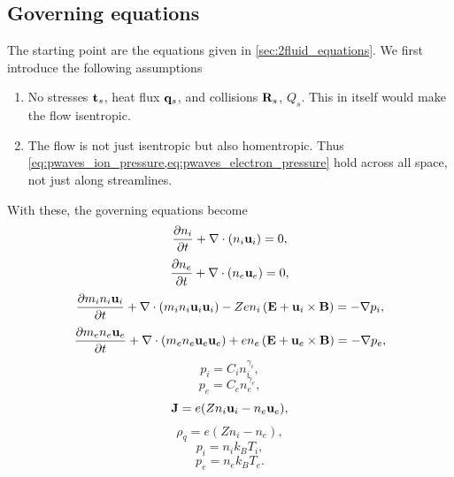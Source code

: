 \documentclass[a4paper,11pt]{report}
\begin{document}
\subsection{Governing equations}
The starting point are the equations given in \cref{sec:2fluid_equations}. We first introduce the following assumptions
\begin{enumerate}
    \item No stresses $\mathbf{t}_s$, heat flux $\mathbf{q}_s$, and collisions $\mathbf{R}_s$, $Q_s$. This in itself would make the flow isentropic.
    \item The flow is not just isentropic but also homentropic. Thus \cref{eq:pwaves_ion_pressure,eq:pwaves_electron_pressure} hold across all space, not just along streamlines.
\end{enumerate}
With these, the governing equations become
\begin{equation}
    \label{eq:pwaves_ion_density}
    \frac{\partial n_i}{\partial t} + \nabla \cdot \left (n_i \mathbf{u}_i \right ) = 0,
\end{equation}
\begin{equation}
    \label{eq:pwaves_electron_density}
    \frac{\partial n_e}{\partial t} + \nabla \cdot \left (n_e \mathbf{u}_e \right ) = 0,
\end{equation}
\begin{equation}
    \label{eq:pwaves_ion_momentum}
    \frac{\partial m_i n_i \mathbf{u}_i}{\partial t} + \nabla \cdot \left ( m_i n_i \mathbf{u}_i \mathbf{u}_i \right ) - Ze n_i \left ( \mathbf{E} + \mathbf{u}_i \times \mathbf{B} \right ) = -\nabla p_i,
\end{equation}
\begin{equation}
    \label{eq:pwaves_electron_momentum}
    \frac{\partial m_e n_e \mathbf{u}_e}{\partial t} + \nabla \cdot \left ( m_e n_e \mathbf{u}_e \mathbf{u}_e \right ) + e n_e \left ( \mathbf{E} + \mathbf{u}_e \times \mathbf{B} \right ) = -\nabla p_e,
\end{equation}
\begin{equation}
    \label{eq:pwaves_ion_pressure}
    p_i = C_i n_i^{\gamma_i},
\end{equation}
\begin{equation}
    \label{eq:pwaves_electron_pressure}
    p_e = C_e n_e^{\gamma_e},
\end{equation}
\begin{equation}
    \label{eq:p_waves_curr_density}
    \mathbf{J} = e (Z n_i \mathbf{u}_i - n_e \mathbf{u}_e),
\end{equation}
\begin{equation}
    \label{eq:p_waves_mass_density}
    \rho_q = e (Z n_i - n_e),
\end{equation}
\begin{equation}
    p_i = n_i k_B T_i,
\end{equation}
\begin{equation}
    p_e = n_e k_B T_e.
\end{equation}
\end{document}
